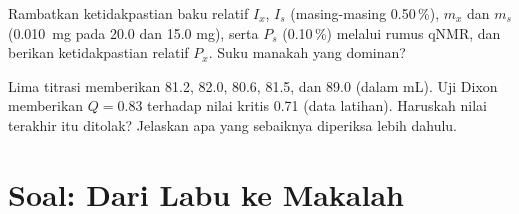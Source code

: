 \begin{exercise}[$\star\star\star$]\label{exo:b3:lab-techniques-3:11}
Rambatkan ketidakpastian baku relatif $I_x$, $I_s$ (masing-masing 0.50\,\%), $m_x$ dan $m_s$ (\qty{0.010}{mg} pada 20.0
dan 15.0 mg), serta $P_s$ (0.10\,\%) melalui rumus qNMR, dan berikan ketidakpastian relatif $P_x$.
Suku manakah yang dominan?
\end{exercise}

\begin{exercise}[$\star\star\star$]\label{exo:b3:lab-techniques-3:12}
Lima titrasi memberikan 81.2, 82.0, 80.6, 81.5, dan 89.0 (dalam mL). Uji Dixon memberikan
$Q = 0.83$ terhadap nilai kritis 0.71 (data latihan). Haruskah nilai terakhir itu
ditolak? Jelaskan apa yang sebaiknya diperiksa lebih dahulu.
\end{exercise}

\section{Soal: Dari Labu ke Makalah}

